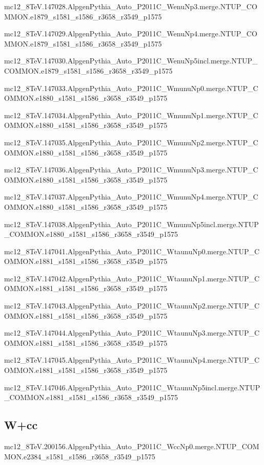     mc12\_8TeV.147028.AlpgenPythia\_Auto\_P2011C\_WenuNp3.merge.NTUP\_COMMON.e1879\_s1581\_s1586\_r3658\_r3549\_p1575

    mc12\_8TeV.147029.AlpgenPythia\_Auto\_P2011C\_WenuNp4.merge.NTUP\_COMMON.e1879\_s1581\_s1586\_r3658\_r3549\_p1575

    mc12\_8TeV.147030.AlpgenPythia\_Auto\_P2011C\_WenuNp5incl.merge.NTUP\_COMMON.e1879\_s1581\_s1586\_r3658\_r3549\_p1575

    mc12\_8TeV.147033.AlpgenPythia\_Auto\_P2011C\_WmunuNp0.merge.NTUP\_COMMON.e1880\_s1581\_s1586\_r3658\_r3549\_p1575

    mc12\_8TeV.147034.AlpgenPythia\_Auto\_P2011C\_WmunuNp1.merge.NTUP\_COMMON.e1880\_s1581\_s1586\_r3658\_r3549\_p1575

    mc12\_8TeV.147035.AlpgenPythia\_Auto\_P2011C\_WmunuNp2.merge.NTUP\_COMMON.e1880\_s1581\_s1586\_r3658\_r3549\_p1575

    mc12\_8TeV.147036.AlpgenPythia\_Auto\_P2011C\_WmunuNp3.merge.NTUP\_COMMON.e1880\_s1581\_s1586\_r3658\_r3549\_p1575

    mc12\_8TeV.147037.AlpgenPythia\_Auto\_P2011C\_WmunuNp4.merge.NTUP\_COMMON.e1880\_s1581\_s1586\_r3658\_r3549\_p1575

    mc12\_8TeV.147038.AlpgenPythia\_Auto\_P2011C\_WmunuNp5incl.merge.NTUP\_COMMON.e1880\_s1581\_s1586\_r3658\_r3549\_p1575

    mc12\_8TeV.147041.AlpgenPythia\_Auto\_P2011C\_WtaunuNp0.merge.NTUP\_COMMON.e1881\_s1581\_s1586\_r3658\_r3549\_p1575

    mc12\_8TeV.147042.AlpgenPythia\_Auto\_P2011C\_WtaunuNp1.merge.NTUP\_COMMON.e1881\_s1581\_s1586\_r3658\_r3549\_p1575

    mc12\_8TeV.147043.AlpgenPythia\_Auto\_P2011C\_WtaunuNp2.merge.NTUP\_COMMON.e1881\_s1581\_s1586\_r3658\_r3549\_p1575

    mc12\_8TeV.147044.AlpgenPythia\_Auto\_P2011C\_WtaunuNp3.merge.NTUP\_COMMON.e1881\_s1581\_s1586\_r3658\_r3549\_p1575

    mc12\_8TeV.147045.AlpgenPythia\_Auto\_P2011C\_WtaunuNp4.merge.NTUP\_COMMON.e1881\_s1581\_s1586\_r3658\_r3549\_p1575

    mc12\_8TeV.147046.AlpgenPythia\_Auto\_P2011C\_WtaunuNp5incl.merge.NTUP\_COMMON.e1881\_s1581\_s1586\_r3658\_r3549\_p1575


\subsection{W+cc}
   mc12\_8TeV.200156.AlpgenPythia\_Auto\_P2011C\_WccNp0.merge.NTUP\_COMMON.e2384\_s1581\_s1586\_r3658\_r3549\_p1575

